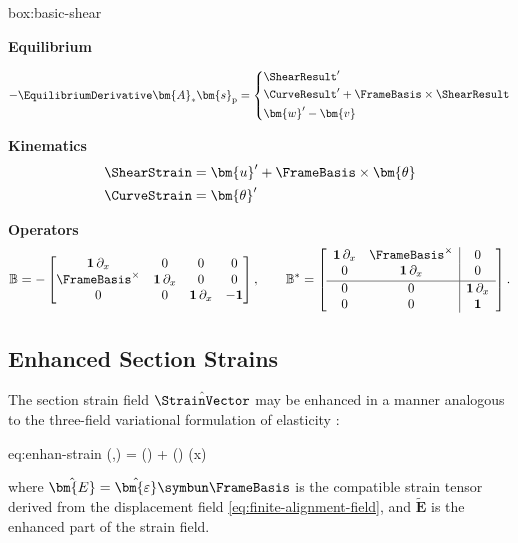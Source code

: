 \begin{ambox}{box:basic-shear}

\textbf{Equilibrium}

\begin{equation}
-\EquilibriumDerivative\bm{A}_* \bm{s}_{\mathrm{p}} = \left\{\begin{aligned}
& \ShearResult^{\prime} \\
& \CurveResult^{\prime} + \FrameBasis \times\ShearResult \\
& \bm{w}' - \bm{v}
\end{aligned}
\right.
\end{equation}

\textbf{Kinematics}
$$
\begin{aligned}
\ShearStrain &= \bm{u}^{\prime}+\FrameBasis  \times \bm{\theta} \\
\CurveStrain &= \bm{\theta}^{\prime}
\end{aligned}
$$

\textbf{Operators}
\[
  \mathbb{B}
  =
  -\begin{bmatrix}
    \mathbf{1}\,\partial_x & 0 & 0 & 0 \\
    \FrameBasis^{\times} & \mathbf{1}\,\partial_x & 0 & 0 \\
    0 & 0 & \mathbf{1}\,\partial_x & -\mathbf{1}
  \end{bmatrix},
  \qquad
  \mathbb{B}^*
  =
  \left[\begin{array}{cc|c}
    \mathbf{1}\,\partial_x & \FrameBasis^{\times} & 0 \\
    0 & \mathbf{1}\,\partial_x & 0 \\[0.3ex]
    \hline
    0 & 0 & \mathbf{1}\,\partial_x \\
    0 & 0 & \mathbf{1}
  \end{array}\right].
\]
\end{ambox}


\subsection{Enhanced Section Strains}\label{sec:enhan-section}

The section strain field \(\hat{\StrainVector}\) may be enhanced in a manner analogous to the three-field variational formulation of elasticity \citep{simo1986variational,simo1990class,simo1992geometrically}:
\begin{SaveEquation}{eq:enhan-strain}
\StrainVector(,) =  \hat{\StrainVector}() + \EnhanShapes() \bm{\EnhanParam}(x)
\end{SaveEquation}
where \(\hat{\bm{E}} = \hat{\bm{\varepsilon}}\symbun\FrameBasis\) is the compatible strain tensor derived from the displacement field \eqref{eq:finite-alignment-field}, and $\tilde{\bm{E}}$ is the enhanced part of the strain field. 


